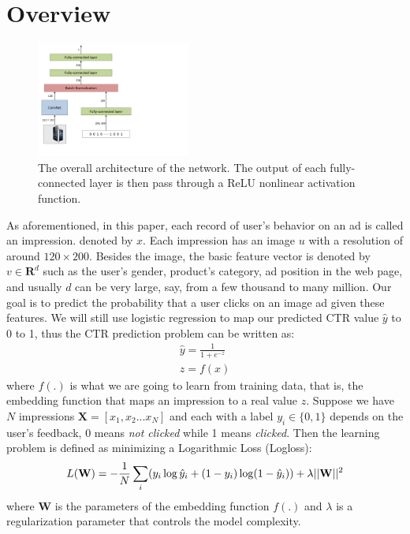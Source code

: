 \documentclass{sig-alternate}
\begin{document}
\section{Overview}\label{Overview}
\begin{figure}
	\centering
	\includegraphics[width=0.45\textwidth]{pic}
	\caption{The overall architecture of the network. The output of each fully-connected layer is then pass through a ReLU nonlinear activation function.}
	\label{fig:net}
\end{figure}
As aforementioned,
in this paper, each record of user's behavior on an ad is called an impression. denoted by $x$. Each impression has an image $u$ with a resolution of around $120 \times 200$. Besides the image, the basic feature vector is denoted by $v \in \mathbf{R}^{d}$ such as the  user's gender, product's category, ad position in the web page, and usually $d$ can be very large, say, from a few thousand to many million.
Our goal is to predict the probability that a user clicks on an image ad given these features. We will still use logistic regression to map our predicted CTR value $\hat{y}$ to 0 to 1, thus the CTR prediction problem can be written as:
\begin{gather}
\hat{y} = \frac{1}{1+e^{-z}} \\
z = f(x)
\end{gather}
where $f(.)$ is what we are going to learn from training data, that is, the embedding function that maps an impression to a real value $z$.  Suppose we have $N$ impressions $\mathbf{X}=[x_{1}, x_{2}...x_{N}]$ and each with a label $y_{i} \in \{0,1\}$ depends on the user's feedback, 0 means \emph{not clicked} while 1 means \emph{clicked}. Then the learning problem is defined as minimizing a Logarithmic Loss (Logloss):
\begin{equation}
L(\mathbf{W}) = -\frac{1}{N} \sum_{i} (y_{i} \log \hat{y}_{i} + (1-y_{i}) \log (1-\hat{y}_{i}) )  \\ + \lambda || \mathbf{W}||^{2}
\end{equation}
where $\mathbf{W}$ is the parameters of the embedding function $f(.) $ and $\lambda$ is a regularization parameter that controls the model complexity.
\end{document}
